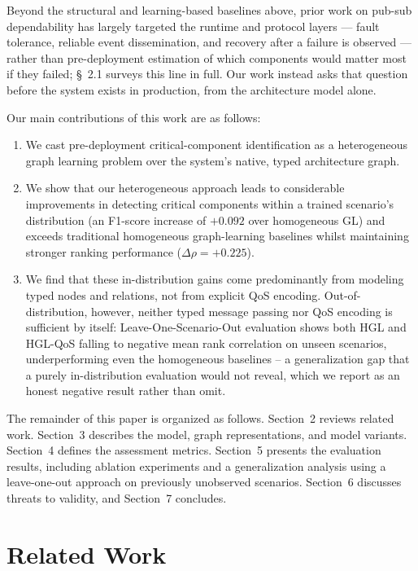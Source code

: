 \documentclass[review]{elsarticle}
\begin{document}
Beyond the structural and learning-based baselines above, prior work on pub-sub dependability has
largely targeted the runtime and protocol layers --- fault tolerance, reliable event dissemination,
and recovery after a failure is observed \cite{Eugster2003,Carzaniga2001} --- rather than
pre-deployment estimation of which components would matter most if they failed; \S~2.1 surveys this
line in full. Our work instead asks that question before the system exists in production, from the
architecture model alone.

Our main contributions of this work are as follows:

\begin{enumerate}
\item We cast pre-deployment critical-component identification as a heterogeneous graph learning
  problem over the system's native, typed architecture graph.
\item We show that our heterogeneous approach leads to considerable improvements in detecting
  critical components within a trained scenario's distribution (an F1-score increase of $+0.092$
  over homogeneous GL) and exceeds traditional homogeneous graph-learning baselines whilst
  maintaining stronger ranking performance ($\Delta\rho=+0.225$).
\item We find that these in-distribution gains come predominantly from modeling typed nodes and
  relations, not from explicit QoS encoding. Out-of-distribution, however, neither typed message
  passing nor QoS encoding is sufficient by itself: Leave-One-Scenario-Out evaluation shows both
  HGL and HGL-QoS falling to negative mean rank correlation on unseen scenarios, underperforming
  even the homogeneous baselines -- a generalization gap that a purely in-distribution evaluation
  would not reveal, which we report as an honest negative result rather than omit.
\end{enumerate}

The remainder of this paper is organized as follows. Section~2 reviews related work. Section~3
describes the model, graph representations, and model variants. Section~4 defines the assessment
metrics. Section~5 presents the evaluation results, including ablation experiments and a
generalization analysis using a leave-one-out approach on previously unobserved scenarios.
Section~6 discusses threats to validity, and Section~7 concludes.

\section{Related Work}
\end{document}
